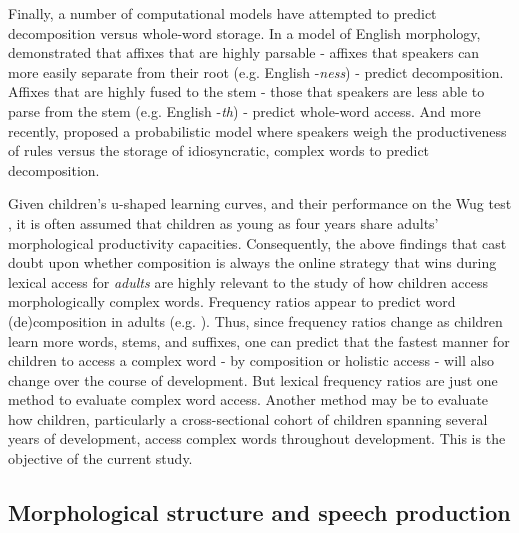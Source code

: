 \documentclass[a4paper,man,floatsintext,natbib,donotrepeattitle, apacite]{apa6}
\begin{document}
Finally, a number of computational models have attempted to predict decomposition versus whole-word storage. In a model of English morphology, \citet{ingoplagSuffixOrderingMorphological2009} demonstrated that affixes that are highly parsable - affixes that speakers can more easily separate from their root (e.g. English -\textit{ness}) - predict decomposition. Affixes that are highly fused to the stem - those that speakers are less able to parse from the stem (e.g. English -\textit{th}) - predict whole-word access. And more recently, \citet{odonnellProductivityReuseLanguage2015} proposed a probabilistic model where speakers weigh the productiveness of rules versus the storage of idiosyncratic, complex words to predict decomposition. 

Given children's u-shaped learning curves, and their performance on the Wug test \citep{berkoChildLearningEnglish1958}, it is often assumed that children as young as four years share adults' morphological productivity capacities. Consequently, the above findings that cast doubt upon whether composition is always the online strategy that wins during lexical access for \textit{adults} are highly relevant to the study of how children access morphologically complex words. Frequency ratios appear to predict word (de)composition in adults (e.g. \citealt{hayCausesConsequencesWord2003}). Thus, since frequency ratios change as children learn more words, stems, and suffixes, one can predict that the fastest manner for children to access a complex word - by composition or holistic access - will also change over the course of development.  But lexical frequency ratios are just one method to evaluate complex word access. Another method may be to evaluate how children, particularly a cross-sectional cohort of children spanning several years of development, access complex words throughout development. This is the objective of the current study. 

\subsection{Morphological structure and speech production}
\end{document}

